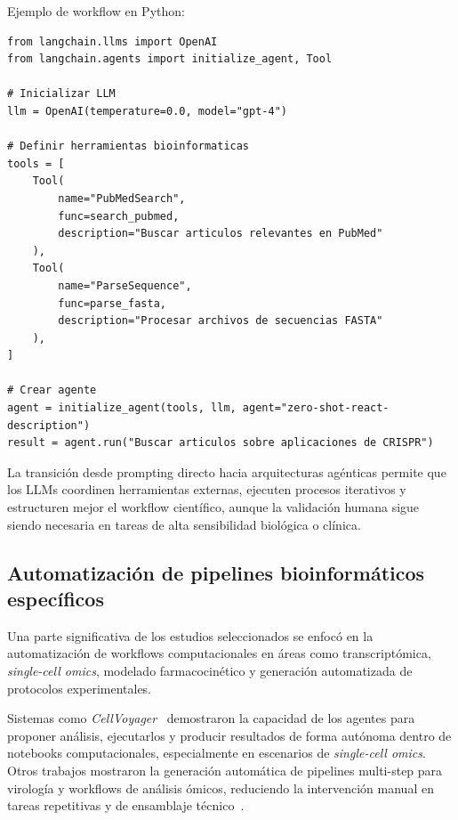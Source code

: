 Ejemplo de workflow en Python:

\begin{lstlisting}[style=python, caption={Workflow en Python con una libreria
  de LLMs, como LangChain u OpenAI API.}, label=lst:python_example]
from langchain.llms import OpenAI
from langchain.agents import initialize_agent, Tool

# Inicializar LLM
llm = OpenAI(temperature=0.0, model="gpt-4")

# Definir herramientas bioinformaticas
tools = [
    Tool(
        name="PubMedSearch",
        func=search_pubmed,
        description="Buscar articulos relevantes en PubMed"
    ),
    Tool(
        name="ParseSequence",
        func=parse_fasta,
        description="Procesar archivos de secuencias FASTA"
    ),
]

# Crear agente
agent = initialize_agent(tools, llm, agent="zero-shot-react-description")
result = agent.run("Buscar articulos sobre aplicaciones de CRISPR")
\end{lstlisting}

\begin{keypoint}
  La transición desde prompting directo hacia arquitecturas agénticas permite
  que los LLMs coordinen herramientas externas, ejecuten procesos iterativos y
  estructuren mejor el workflow científico, aunque la validación humana sigue
  siendo necesaria en tareas de alta sensibilidad biológica o clínica.
\end{keypoint}


\subsection{Automatización de pipelines bioinformáticos específicos}\label{subsec:pipeline-automation}

Una parte significativa de los estudios seleccionados se enfocó en la
automatización de workflows computacionales en áreas como transcriptómica,
\textit{single-cell omics}, modelado farmacocinético y generación automatizada
de protocolos experimentales.

Sistemas como \textit{CellVoyager}~\citep{41845065} demostraron la capacidad de
los agentes para proponer análisis, ejecutarlos y producir resultados de forma
autónoma dentro de notebooks computacionales, especialmente en escenarios de
\textit{single-cell omics}. Otros trabajos mostraron la generación automática
de pipelines multi-step para virología y workflows de análisis ómicos,
reduciendo la intervención manual en tareas repetitivas y de ensamblaje
técnico~\citep{41523654}.

